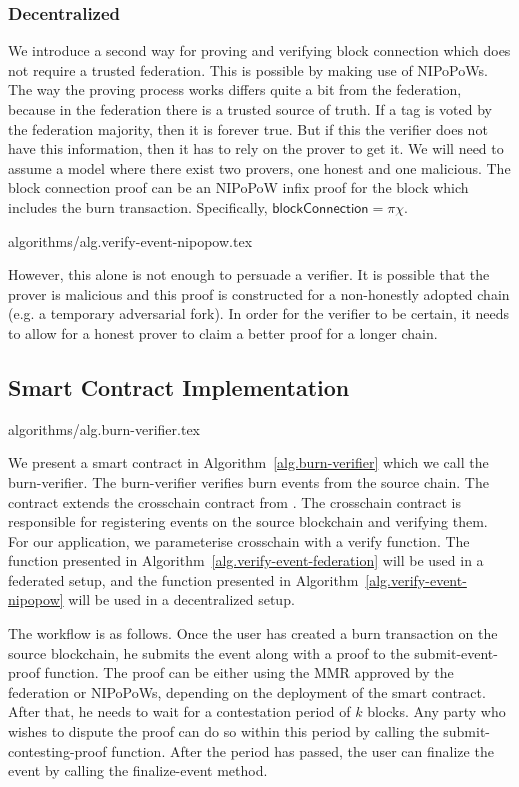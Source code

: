 \subsubsection{Decentralized}
We introduce a second way for proving and verifying block connection which does not require a trusted federation. This is possible by making use of NIPoPoWs. The way the proving process works differs quite a bit from the federation, because in the federation there is a trusted source of truth. If a tag is voted by the federation majority, then it is forever true. But if this the verifier does not have this information, then it has to rely on the prover to get it. We will need to assume a model where there exist two provers, one honest and one malicious. The block connection proof can be an NIPoPoW infix proof for the block which includes the burn transaction. Specifically, $\mathsf{blockConnection} = \pi\chi$.

{algorithms/alg.verify-event-nipopow.tex}

However, this alone is not enough to persuade a verifier. It is possible that the prover is malicious and this proof is constructed for a non-honestly adopted chain (e.g. a temporary adversarial fork). In order for the verifier to be certain, it needs to allow for a honest prover to claim a better proof for a longer chain. 

\subsection{Smart Contract Implementation}
{algorithms/alg.burn-verifier.tex}

We present a smart contract in Algorithm~\ref{alg.burn-verifier} which we call the \textsf{burn-verifier}. The \textsf{burn-verifier} verifies burn events from the source chain. The contract extends the \textsf{crosschain} contract from \cite{pow-sidechains}. The \textsf{crosschain} contract is responsible for registering events on the source blockchain and verifying them. For our application, we parameterise \textsf{crosschain} with a \textsf{verify} function. The function presented in Algorithm~\ref{alg.verify-event-federation} will be used in a federated setup, and the function presented in Algorithm~\ref{alg.verify-event-nipopow} will be used in a decentralized setup.

The workflow is as follows. Once the user has created a burn transaction on the source blockchain, he submits the event along with a proof to the \textsf{submit-event-proof} function. The proof can be either using the MMR approved by the federation or NIPoPoWs, depending on the deployment of the smart contract. After that, he needs to wait for a contestation period of $k$ blocks. Any party who wishes to dispute the proof can do so within this period by calling the \textsf{submit-contesting-proof} function. After the period has passed, the user can finalize the event by calling the \textsf{finalize-event} method.

